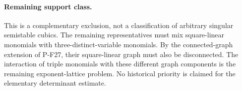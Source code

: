 \paragraph{Remaining support class.}
This is a complementary exclusion, not a classification
of arbitrary singular semistable cubics. The remaining
representatives must mix square-linear monomials with
three-distinct-variable monomials. By the connected-graph
extension of P-F27, their square-linear graph must also
be disconnected. The interaction of triple monomials
with these different graph components is the remaining
exponent-lattice problem. No historical priority is
claimed for the elementary determinant estimate.
